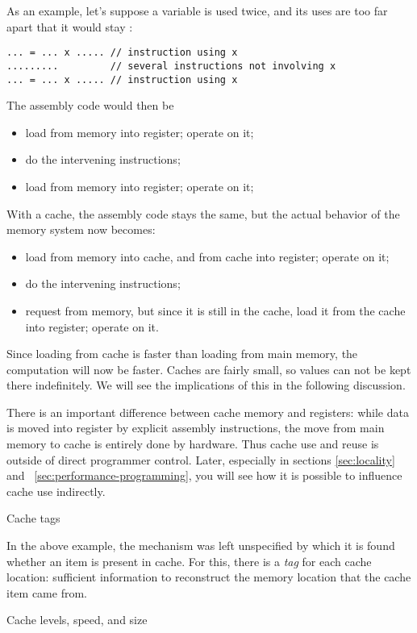 As an example, let's suppose a variable  is used twice, and its
uses are too far apart that it would stay :
\begin{verbatim}
... = ... x ..... // instruction using x
.........         // several instructions not involving x
... = ... x ..... // instruction using x
\end{verbatim}
The assembly code would then be
\begin{itemize}
\item load  from memory into register; operate on it;
\item do the intervening instructions;
\item load  from memory into register; operate on it;
\end{itemize}
With a cache, the assembly code stays the same, but the actual
behavior of the memory system now becomes:
\begin{itemize}
\item load  from memory into cache, and from cache into register;
  operate on it;
\item do the intervening instructions;
\item request  from memory, but since it is still in the cache,
  load it from the cache into register; operate on it.
\end{itemize}
Since loading from cache is faster than loading from main memory, the
computation will now be faster. Caches are fairly small, so values
can not be kept there indefinitely. We will see the implications of
this in the following discussion.

There is an important difference between cache memory and registers:
while data is moved into register by explicit assembly instructions,
the move from main memory to cache is entirely done by hardware.  Thus
cache use and reuse is outside of direct programmer control. Later,
especially in sections \ref{sec:locality} and
~\ref{sec:performance-programming}, you will see how it is possible to
influence cache use indirectly.

 {Cache tags}
\label{sec:cache-tag}

In the above example, the mechanism was left unspecified by which it is found whether an
item is present in cache. For this, there is a
%
\emph{tag}
for each cache location: sufficient information to reconstruct the
memory location that the cache item came from.

 {Cache levels, speed, and size}
\label{sec:cache-level}

